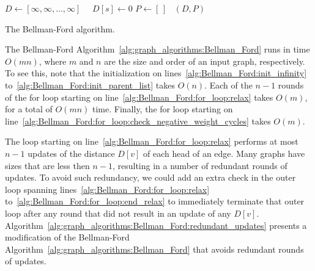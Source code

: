 \begin{algorithm}[!htpb]
\dontprintsemicolon  %
\BlankLine
$D \leftarrow [\infty, \infty, \dots, \infty]$~~\;
$D[s] \leftarrow 0$\;
$P \leftarrow [\,]$~\;
\Return $(D, P)$\;
\caption{The Bellman-Ford algorithm.}
\label{alg:graph_algorithms:Bellman_Ford}
\end{algorithm}

The Bellman-Ford Algorithm~\ref{alg:graph_algorithms:Bellman_Ford}
runs in time $O(mn)$, where $m$ and $n$ are the size and order of an
input graph, respectively. To see this, note that the initialization
on lines~\ref{alg:Bellman_Ford:init_infinity}
to~\ref{alg:Bellman_Ford:init_parent_list} takes $O(n)$. Each of the
$n - 1$ rounds of the for loop starting on
line~\ref{alg:Bellman_Ford:for_loop:relax} takes $O(m)$, for a total
of $O(mn)$ time. Finally, the for loop starting on
line~\ref{alg:Bellman_Ford:for_loop:check_negative_weight_cycles}
takes $O(m)$.

The loop starting on line~\ref{alg:Bellman_Ford:for_loop:relax}
performs at most $n - 1$ updates of the distance $D[v]$ of each head
of an edge. Many graphs have sizes that are less then $n - 1$,
resulting in a number of redundant rounds of updates. To avoid such
redundancy, we could add an extra check in the outer loop spanning
lines~\ref{alg:Bellman_Ford:for_loop:relax}
to~\ref{alg:Bellman_Ford:for_loop:end_relax} to immediately terminate
that outer loop after any round that did not result in an update of
any $D[v]$.
Algorithm~\ref{alg:graph_algorithms:Bellman_Ford:redundant_updates}
presents a modification of the Bellman-Ford
Algorithm~\ref{alg:graph_algorithms:Bellman_Ford} that avoids
redundant rounds of updates.

